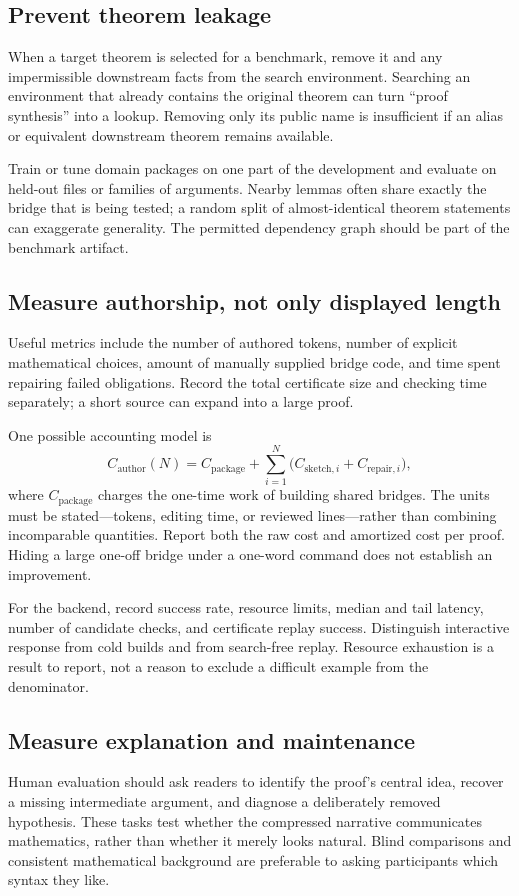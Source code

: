 \documentclass[11pt,a4paper]{article}
\theoremstyle{remark}
\begin{document}
\subsection{Prevent theorem leakage}
When a target theorem is selected for a benchmark, remove it and any impermissible downstream facts from the search environment. Searching an environment that already contains the original theorem can turn ``proof synthesis'' into a lookup. Removing only its public name is insufficient if an alias or equivalent downstream theorem remains available.

Train or tune domain packages on one part of the development and evaluate on held-out files or families of arguments. Nearby lemmas often share exactly the bridge that is being tested; a random split of almost-identical theorem statements can exaggerate generality. The permitted dependency graph should be part of the benchmark artifact.

\subsection{Measure authorship, not only displayed length}
Useful metrics include the number of authored tokens, number of explicit mathematical choices, amount of manually supplied bridge code, and time spent repairing failed obligations. Record the total certificate size and checking time separately; a short source can expand into a large proof.

One possible accounting model is
\begin{equation}
C_{\mathrm{author}}(N)=C_{\mathrm{package}}+
\sum_{i=1}^{N}\bigl(C_{\mathrm{sketch},i}+C_{\mathrm{repair},i}\bigr),
\label{eq:cost}
\end{equation}
where $C_{\mathrm{package}}$ charges the one-time work of building shared bridges. The units must be stated---tokens, editing time, or reviewed lines---rather than combining incomparable quantities. Report both the raw cost and amortized cost per proof. Hiding a large one-off bridge under a one-word command does not establish an improvement.

For the backend, record success rate, resource limits, median and tail latency, number of candidate checks, and certificate replay success. Distinguish interactive response from cold builds and from search-free replay. Resource exhaustion is a result to report, not a reason to exclude a difficult example from the denominator.

\subsection{Measure explanation and maintenance}
Human evaluation should ask readers to identify the proof's central idea, recover a missing intermediate argument, and diagnose a deliberately removed hypothesis. These tasks test whether the compressed narrative communicates mathematics, rather than whether it merely looks natural. Blind comparisons and consistent mathematical background are preferable to asking participants which syntax they like.
\end{document}
